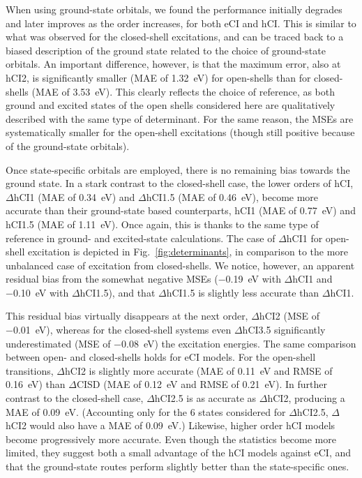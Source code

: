 \documentclass[aip,jcp,reprint,noshowkeys,superscriptaddress]{revtex4-1}
\begin{document}
When using ground-state orbitals, we found the performance initially degrades and later improves as the order increases, for both eCI and hCI.
This is similar to what was observed for the closed-shell excitations,
and can be traced back to a biased description of the ground state related to the choice of ground-state orbitals.
An important difference, however, is that the maximum error, also at hCI2, is significantly smaller (MAE of \SI{1.32}{\eV}) for open-shells
than for closed-shells (MAE of \SI{3.53}{\eV}).
This clearly reflects the choice of reference, as both ground and excited states of the open shells considered here are qualitatively described with the same type of determinant.
For the same reason, the MSEs are systematically smaller for the open-shell excitations (though still positive because of the ground-state orbitals).

Once state-specific orbitals are employed, there is no remaining bias towards the ground state.
In a stark contrast to the closed-shell case, the lower orders of hCI, $\Delta$hCI1 (MAE of \SI{0.34}{\eV}) and $\Delta$hCI1.5 (MAE of \SI{0.46}{\eV}),
become more accurate than their ground-state based counterparts, hCI1 (MAE of \SI{0.77}{\eV}) and hCI1.5 (MAE of \SI{1.11}{\eV}).
Once again, this is thanks to the same type of reference in ground- and excited-state calculations.
The case of $\Delta$hCI1 for open-shell excitation is depicted in Fig.~\ref{fig:determinants}, in comparison to the more unbalanced case of excitation from closed-shells.
We notice, however, an apparent residual bias from the somewhat negative MSEs (\SI{-0.19}{\eV} with $\Delta$hCI1 and \SI{-0.10}{\eV} with $\Delta$hCI1.5),
and that $\Delta$hCI1.5 is slightly less accurate than $\Delta$hCI1.

This residual bias virtually disappears at the next order, $\Delta$hCI2 (MSE of \SI{-0.01}{\eV}),
whereas for the closed-shell systems even $\Delta$hCI3.5 significantly underestimated (MSE of \SI{-0.08}{\eV}) the excitation energies.
The same comparison between open- and closed-shells holds for eCI models.
For the open-shell transitions, $\Delta$hCI2 is slightly more accurate (MAE of \SI{0.11}{\eV} and RMSE of \SI{0.16}{\eV}) than $\Delta$CISD (MAE of \SI{0.12}{\eV} and RMSE of \SI{0.21}{\eV}).
In further contrast to the closed-shell case,
$\Delta$hCI2.5 is as accurate as $\Delta$hCI2, producing a MAE of \SI{0.09}{\eV}.
(Accounting only for the 6 states considered for $\Delta$hCI2.5, $\Delta$hCI2 would also have a MAE of \SI{0.09}{\eV}.)
Likewise, higher order hCI models become progressively more accurate.
Even though the statistics become more limited,
they suggest both a small advantage of the hCI models against eCI,
and that the ground-state routes perform slightly better than the state-specific ones.
\end{document}
